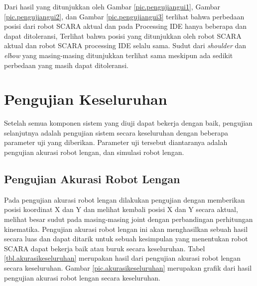 Dari hasil yang ditunjukkan oleh Gambar \ref{pic.pengujiangui1}, Gambar \ref{pic.pengujiangui2}, dan Gambar \ref{pic.pengujiangui3} terlihat bahwa perbedaan posisi dari robot SCARA aktual dan pada Processing IDE hanya beberapa dan dapat ditoleransi, Terlihat bahwa posisi yang ditunjukkan oleh robot SCARA aktual dan robot SCARA processing IDE selalu sama. Sudut dari \textit{shoulder} dan \textit{elbow} yang masing-masing ditunjukkan terlihat sama meskipun ada sedikit perbedaan yang masih dapat ditoleransi.

\section{Pengujian Keseluruhan}
Setelah semua komponen sistem yang diuji dapat bekerja dengan baik, pengujian selanjutnya adalah pengujian sistem secara keseluruhan dengan beberapa parameter uji yang diberikan. Parameter uji tersebut diantaranya adalah pengujian akurasi robot lengan, dan simulasi robot lengan. 

\subsection{Pengujian Akurasi Robot Lengan}
Pada pengujian akurasi robot lengan dilakukan pengujian dengan memberikan posisi koordinat X dan Y dan melihat kembali posisi X dan Y secara aktual, melihat besar sudut pada masing-masing joint dengan perbandingan perhitungan kinematika. Pengujian akurasi robot lengan ini akan menghasilkan sebuah hasil secara luas dan dapat ditarik untuk sebuah kesimpulan yang menentukan robot SCARA dapat bekerja baik atau buruk secara keseluruhan. Tabel \ref{tbl.akurasikeseluruhan} merupakan hasil dari pengujian akurasi robot lengan secara keseluruhan. Gambar \ref{pic.akurasikeseluruhan} merupakan grafik dari hasil pengujian akurasi robot lengan secara keseluruhan.

